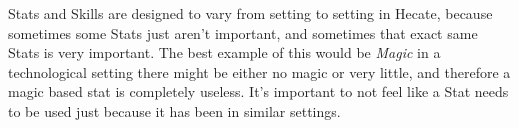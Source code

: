 
\Glspl{Stat} and \Glspl{Skill} are designed to vary from setting to
setting in Hecate, because sometimes some \glspl{Stat} just aren't
important, and sometimes that exact same \glspl{Stat} is very
important. The best example of this would be \emph{Magic} in a
technological setting there might be either no magic or very little,
and therefore a magic based stat is completely useless. It's
important to not feel like a \gls{Stat} needs to be used just
because it has been in similar settings.
